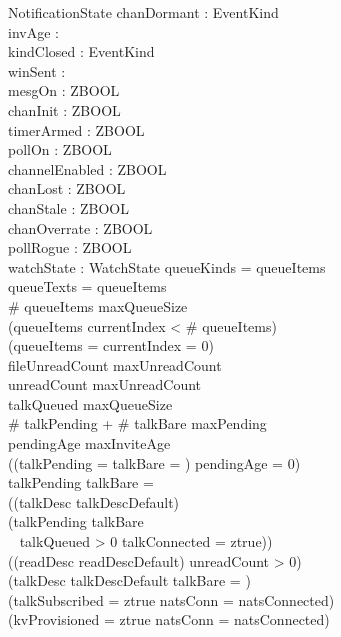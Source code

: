 \documentclass[a4paper,10pt,fleqn]{article}
\begin{document}
\begin{schema}{NotificationState}
  chanDormant : \power EventKind \\
  invAge : \nat \\
  kindClosed : \power EventKind \\
  winSent : \nat \\
  mesgOn : ZBOOL \\
  chanInit : ZBOOL \\
  timerArmed : ZBOOL \\
  pollOn : ZBOOL \\
  channelEnabled : ZBOOL \\
  chanLost : ZBOOL \\
  chanStale : ZBOOL \\
  chanOverrate : ZBOOL \\
  pollRogue : ZBOOL \\
  watchState : WatchState
  \where
  \dom queueKinds = \ran queueItems \\
  \dom queueTexts = \ran queueItems \\
  \# queueItems \leq maxQueueSize \\
  (queueItems \neq \langle \rangle \implies
  currentIndex < \# queueItems) \\
  (queueItems = \langle \rangle \implies
  currentIndex = 0) \\
  fileUnreadCount \leq maxUnreadCount \\
  unreadCount \leq maxUnreadCount \\
  talkQueued \leq maxQueueSize \\
  \# talkPending + \# talkBare \leq maxPending \\
  pendingAge \leq maxInviteAge \\
  ((\dom talkPending = \emptyset \land talkBare = \emptyset) \implies
  pendingAge = 0) \\
  \dom talkPending \cap talkBare = \emptyset \\
  ((talkDesc \neq talkDescDefault) \iff \\
  \quad (\dom talkPending \neq \emptyset \lor talkBare \neq \emptyset \lor \\
  \quad~ talkQueued > 0 \lor talkConnected = ztrue)) \\
  ((readDesc \neq readDescDefault) \iff unreadCount > 0) \\
  (talkDesc \neq talkDescDefault \implies talkBare = \emptyset) \\
  (talkSubscribed = ztrue \implies
  natsConn = natsConnected) \\
  (kvProvisioned = ztrue \implies
  natsConn = natsConnected) \\

\end{schema}
\end{document}
